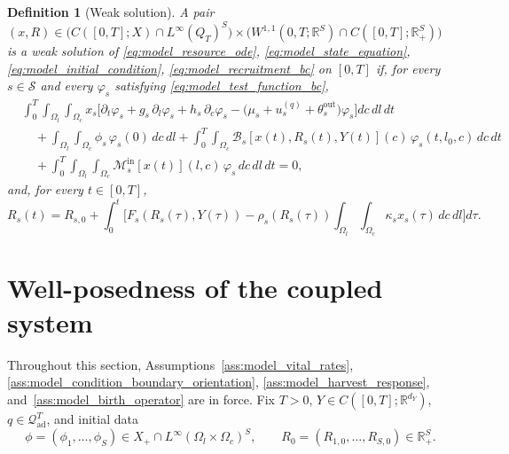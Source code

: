 \documentclass[pdflatex,sn-mathphys-num]{sn-jnl}%
\newtheorem{definition}[theorem]{Definition}
\begin{document}
\begin{definition}[Weak solution]\label{def:model_weak_solution}
A pair
\((x,R)\in
\big(C([0,T];X)\cap L^\infty(Q_T)^S\big)
\times
\big(W^{1,1}(0,T;\mathbb R^S)\cap C([0,T];\mathbb R_+^S)\big)\)
is a \emph{weak solution} of
\eqref{eq:model_resource_ode}, \eqref{eq:model_state_equation},
\eqref{eq:model_initial_condition}, \eqref{eq:model_recruitment_bc}
on \([0,T]\) if, for every \(s\in\mathcal S\) and every
\(\varphi_s\) satisfying \eqref{eq:model_test_function_bc},
\begin{equation}\label{eq:model_weak_formulation}
\begin{aligned}
&\int_0^T\!\int_{\Omega_l}\!\int_{\Omega_c}
x_s
\Big[
\partial_t\varphi_s
+g_s\,\partial_l\varphi_s
+h_s\,\partial_c\varphi_s
-\big(\mu_s+u_s^{(q)}+\theta_s^{\mathrm{out}}\big)\varphi_s
\Big]dc\,dl\,dt
\\
&\quad
+\int_{\Omega_l}\!\int_{\Omega_c}\phi_s\,\varphi_s(0)\,dc\,dl
+\int_0^T\!\int_{\Omega_c}
\mathcal B_s[x(t),R_s(t),Y(t)](c)\,\varphi_s(t,l_0,c)\,dc\,dt
\\
&\quad
+\int_0^T\!\int_{\Omega_l}\!\int_{\Omega_c}
\mathcal M_s^{\mathrm{in}}[x(t)](l,c)\,\varphi_s\,dc\,dl\,dt
=0,
\end{aligned}
\end{equation}
and, for every \(t\in[0,T]\),
\begin{equation}\label{eq:model_resource_integral}
R_s(t)
=R_{s,0}
+\int_0^t
\Big[
F_s(R_s(\tau),Y(\tau))
-\rho_s(R_s(\tau))
\int_{\Omega_l}\!\int_{\Omega_c}
\kappa_s x_s(\tau)\,dc\,dl
\Big]d\tau.
\end{equation}
\end{definition}


\section{Well-posedness of the coupled system}\label{sec:wellposedness}
Throughout this section, Assumptions~\ref{ass:model_vital_rates}, \ref{ass:model_condition_boundary_orientation}, \ref{ass:model_harvest_response}, and~\ref{ass:model_birth_operator}
are in force. Fix \(T>0\), \(Y\in C([0,T];\mathbb R^{d_Y})\),
\(q\in\mathcal Q_{\mathrm{ad}}^T\), and initial data
\[
\phi=(\phi_1,\dots,\phi_S)\in X_+\cap L^\infty(\Omega_l\times\Omega_c)^S,
\qquad
R_0=(R_{1,0},\dots,R_{S,0})\in\mathbb R_+^S.
\]
\end{document}
